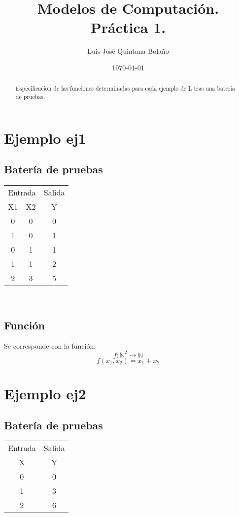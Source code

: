 \documentclass[a4paper]{article}
\title{Modelos de Computación.\\ Práctica 1. }
\author{Luis José Quintana Bolaño}
\date{\today}
\begin{document}
		\maketitle
		\begin{abstract}
		    Especificación de las funciones determinadas para cada ejemplo de L tras una batería de pruebas.
  		\end{abstract}

  		\section{Ejemplo ej1}
  		    \subsection{Batería de pruebas}
			\begin{center}
  		        \begin{tabular}{|c|c|c|} \hline
  		            \multicolumn{2}{|l|}{Entrada}&\multicolumn{1}{l|}{Salida}\\
			    X1 & X2 & Y \\
  		            \hline
  		        0 & 0 & 0 \\
			    1 & 0 & 1 \\
			    0 & 1 & 1 \\
			    1 & 1 & 2 \\
			    2 & 3 & 5 \\
  		            \hline
  		        \end{tabular} \\
			\end{center}
  		    \subsection{Función}
  		        Se corresponde con la función:
  		        $$f: \mathbb{N}^2 \longrightarrow \mathbb{N}$$
  		        \begin{equation*}
  		        	f(x_1,x_2) = x_1 + x_2 
  		        \end{equation*}

  		\section{Ejemplo ej2}
  			\subsection{Batería de pruebas}
  			\begin{center}
  				\begin{tabular}{|c|c|} \hline
  					\multicolumn{1}{|l|}{Entrada}&\multicolumn{1}{l|}{Salida}\\
  				X & Y \\
  					\hline
  				0 & 0 \\
  				1 & 3 \\
  				2 & 6 \\
  					\hline
  				\end{tabular} \\
  			\end{center}
\end{document}
